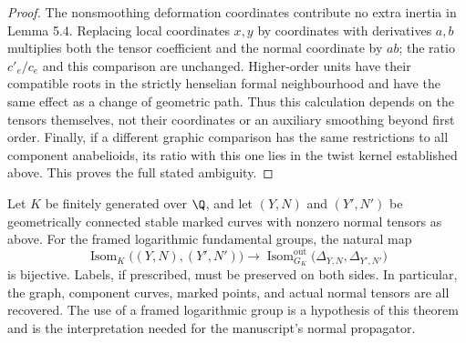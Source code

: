 \begin{proof}
The nonsmoothing deformation coordinates contribute no extra inertia in Lemma 5.4. Replacing local coordinates $x,y$ by coordinates with derivatives $a,b$ multiplies both the tensor coefficient and the normal coordinate by $ab$; the ratio $c'_e/c_e$ and this comparison are unchanged. Higher-order units have their compatible roots in the strictly henselian formal neighbourhood and have the same effect as a change of geometric path. Thus this calculation depends on the tensors themselves, not their coordinates or an auxiliary smoothing beyond first order. Finally, if a different graphic comparison has the same restrictions to all component anabelioids, its ratio with this one lies in the twist kernel established above. This proves the full stated ambiguity.
\end{proof}

\begin{theorem}\label{A6-anabelian}
Let $K$ be finitely generated over $\Q$, and let $(Y,N)$ and $(Y',N')$ be geometrically connected stable marked curves with nonzero normal tensors as above. For the framed logarithmic fundamental groups, the natural map
\[
 \operatorname{Isom}_K\bigl((Y,N),(Y',N')\bigr)
 \longrightarrow
 \operatorname{Isom}^{\mathrm{out}}_{G_K}
       \bigl(\Delta_{Y,N},\Delta_{Y',N'}\bigr)
\]
is bijective. Labels, if prescribed, must be preserved on both sides. In particular, the graph, component curves, marked points, and actual normal tensors are all recovered. The use of a framed logarithmic group is a hypothesis of this theorem and is the interpretation needed for the manuscript's normal propagator.
\end{theorem}
